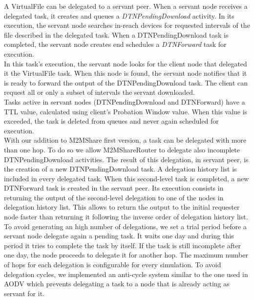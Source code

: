A VirtualFile can be delegated to a servant peer. When a servant node receives a delegated task, it creates and queues a \textit{DTNPendingDownload} activity. In its execution, the servant node searches in-reach devices for requested intervals of the file described in the delegated task. When a DTNPendingDownload task is completed, the servant node creates end schedules a \textit{DTNForward} task for execution.
\\

In this task's execution, the servant node looks for the client node that delegated it the VirtualFile task. When this node is found, the servant node notifies that it is ready to forward the output of the DTNPendingDownload task. The client can request all or only a subset of intervals the servant downloaded.
\\

Tasks active in servant nodes (DTNPendingDownload and DTNForward) have a TTL value, calculated using client's Probation Window value. When this value is exceeded, the task is deleted from queues and never again scheduled for execution.
\\

With our addition to M2MShare first version, a task can be delegated with more than one hop. To do so we allow M2MShareRouter to delegate also incomplete DTNPendingDownload activities. The result of this delegation, in servant peer, is the creation of a new DTNPendingDownload task. A delegation history list is included in every delegated task. When this second-level task is completed, a new DTNForward task is created in the servant peer. Its execution consists in returning the output of the second-level delegation to one of the nodes in delegation history list. This allows to return the output to the initial requester node faster than returning it following the inverse order of delegation history list.
\\

To avoid generating an high number of delegations, we set a trial period before a servant node delegate again a pending task. It waits one day and during this period it tries to complete the task by itself. If the task is still incomplete after one day, the node proceeds to delegate it for another hop. The maximum number of hops for each delegation is configurable for every simulation. To avoid delegation cycles, we implemented an anti-cycle system similar to the one used in AODV \cite{aodv} which prevents delegating a task to a node that is already acting as servant for it. 

